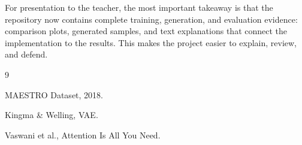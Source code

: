 \documentclass{article}
\begin{document}
For presentation to the teacher, the most important takeaway is that the repository now contains complete training, generation, and evaluation evidence: comparison plots, generated samples, and text explanations that connect the implementation to the results. This makes the project easier to explain, review, and defend.

\begin{thebibliography}{9}

MAESTRO Dataset, 2018.

Kingma & Welling, VAE.

Vaswani et al., Attention Is All You Need.

\end{thebibliography}
\end{document}
